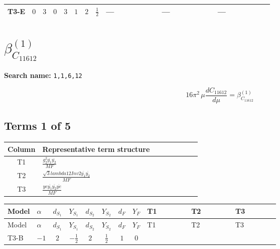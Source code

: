 \documentclass[8pt]{article}
\begin{document}
\begin{landscape}
\begin{longtable}{@{}llcccccc >{\raggedright\arraybackslash}p{0.21\linewidth} >{\raggedright\arraybackslash}p{0.21\linewidth} >{\raggedright\arraybackslash}p{0.21\linewidth}@{}}
\midrule
T3-E & $0$ & $3$ & $0$ & $3$ & $1$ & $2$ & $\frac{1}{2}$ & --- & --- & --- \\
\midrule
\bottomrule
\end{longtable}
\clearpage
\section*{$\beta_{C_{11612}}^{(1)}$}
\noindent\textbf{Search name: }\texttt{1,1,6,12}\par\smallskip
\[16\pi^2\,\mu\frac{d C_{11612}}{d\mu}=\beta_{C_{11612}}^{(1)}\]
\subsection*{Terms 1 of 5}
\begin{center}
\begin{tabular}{@{}c >{\raggedright\arraybackslash}p{0.82\linewidth}@{}}
\toprule
Column & Representative term structure \\
\midrule
T1 & \(\displaystyle \frac{g_{2}^{2} \overline{y_{1}} \overline{y_{2}}}{MF}\) \\
\midrule
T2 & \(\displaystyle \frac{\sqrt{3} lambda12Inv2 \overline{y_{1}} \overline{y_{2}}}{MF}\) \\
\midrule
T3 & \(\displaystyle \frac{ye \overline{y_{1}} \overline{y_{2}} \overline{ye}}{MF}\) \\
\midrule
\bottomrule
\end{tabular}
\end{center}
\smallskip
\tiny
\begin{longtable}{@{}llcccccc >{\raggedright\arraybackslash}p{0.21\linewidth} >{\raggedright\arraybackslash}p{0.21\linewidth} >{\raggedright\arraybackslash}p{0.21\linewidth}@{}}
\toprule
Model & $\alpha$ & $d_{S_1}$ & $Y_{S_1}$ & $d_{S_2}$ & $Y_{S_2}$ & $d_F$ & $Y_F$ & T1 & T2 & T3 \\
\midrule
\endfirsthead
\toprule
Model & $\alpha$ & $d_{S_1}$ & $Y_{S_1}$ & $d_{S_2}$ & $Y_{S_2}$ & $d_F$ & $Y_F$ & T1 & T2 & T3 \\
\midrule
\endhead
T3-B & $-1$ & $2$ & $-\frac{1}{2}$ & $2$ & $\frac{1}{2}$ & $1$ & $0$ & \scriptsize\adjustbox{max width=\linewidth}{$\begin{gathered} - \frac{3 g_{2}^{2} \overline{y_{1}} \overline{y_{2}}}{4 MF}\end{gathered}$} & \scriptsize\adjustbox{max width=\linewidth}{$\begin{gathered} - \frac{\sqrt{3} lambda12Inv2 \overline{y_{1}} \overline{y_{2}}}{3 MF}\end{gathered}$} & \scriptsize\adjustbox{max width=\linewidth}{$\begin{gathered} \frac{ye \overline{y_{1}} \overline{y_{2}} \overline{ye}}{4 MF}\end{gathered}$} \\

\end{longtable}
\end{landscape}
\end{document}
